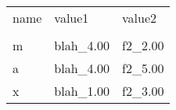 \begin{tabular}{l|ll}
\toprule
name &    value1 &  value2 \\
     &           &         \\
\midrule
   m & blah\_4.00 & f2\_2.00 \\
   a & blah\_4.00 & f2\_5.00 \\
   x & blah\_1.00 & f2\_3.00 \\
\bottomrule
\end{tabular}
